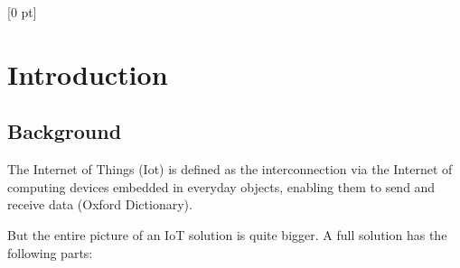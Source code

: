 
\titlespacing{\chapter}{0 pt}{30 pt}{50 pt}[0 pt]
\titleformat{\section}{\Large\bfseries}{\thesection}{0 pt}{\hspace{30 pt}}
\titleformat{\subsection}{\large\bfseries}{\thesubsection}{0 pt}{\hspace{30 pt}}
\pagestyle{fancy}
\fancyhead[LO,LE]{\footnotesize\textit{\leftmark}}
\fancyhead[RO,RE]{\thepage}
\fancyfoot[CO,CE]{}

\chapter{Introduction} %

\normalsize

\section{Background}
\vspace{30 pt}
\noindent
The Internet of Things (Iot) is defined as the interconnection via the Internet 
of computing devices embedded in everyday objects, enabling them to send and 
receive data (Oxford Dictionary). 

But the entire picture of an IoT solution is quite bigger. A full solution has 
the following parts:


